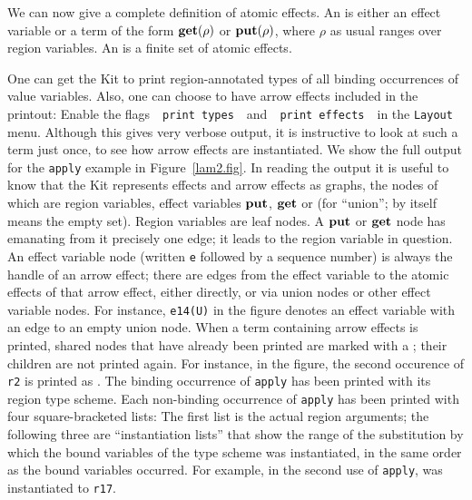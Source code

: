 \documentclass[12pt]{book}
\begin{document}
We can now give a complete definition of atomic effects. 
An  is either an effect
variable or a term of the form $\mathop{\bf get}\nolimits(\rho)$ or $\mathop{\bf put}\nolimits(\rho)$, where $\rho$ as usual ranges over region
variables. An  is a finite set of atomic effects.

One can get the Kit to print region-annotated types of all binding
occurrences of value variables.  Also, one can choose to have arrow
effects included in the printout: Enable the flags~~\texttt{print
  types}~~and~~\texttt{print effects}~~in the \texttt{Layout} menu.
Although this gives very verbose output, it is instructive to look at
such a term just once, to see how arrow effects are
instantiated. We show the full output for the {\tt apply} example in
Figure~\ref{lam2.fig}. In reading the output it is useful to know that
the Kit represents effects and arrow effects as graphs, the nodes of
which are region variables, effect variables $\mathop{\bf put}\nolimits$, $\mathop{\bf get}\nolimits$ or
 (for ``union'';  by itself means the empty set). 
Region variables are leaf nodes. A $\mathop{\bf put}\nolimits$
or $\mathop{\bf get}\nolimits$ node has emanating from it precisely one edge; it leads to
the region variable in question.  An effect variable node (written
{\tt e} followed by a sequence number) is always the handle of an
arrow effect; there are edges from the effect variable to the atomic
effects of that arrow effect, either directly, or via union nodes or
other effect variable nodes.  For instance, \texttt{e14(U)} in the
figure denotes an effect variable with an edge to an empty union node.
When a term containing arrow effects is printed, shared nodes that
have already been printed are marked with a ; their children
are not printed again.  For instance, in the figure, the second
occurence of \texttt{r2} is printed as .  The binding
occurrence of {\tt apply} has been printed with its region type
scheme. Each non-binding occurrence of { \tt apply} has been printed
with four square-bracketed lists: The first list is the actual region
arguments; the following three are ``instantiation lists'' that show
the range of the substitution by which the bound variables of the type
scheme was instantiated, in the same order as the bound variables
occurred.  For example, in the second use of {\tt apply}, 
was instantiated to {\tt r17}.
\end{document}
